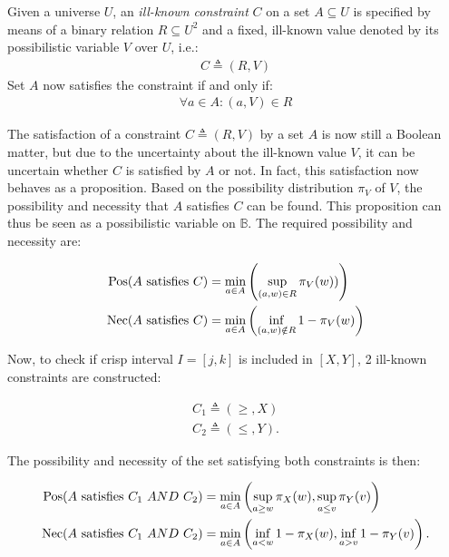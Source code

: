 \begin{definition}
Given a universe $U$, an \emph{ill-known constraint} $C$ on a set $A \subseteq U$ is specified by means of a binary relation $R \subseteq U^{2}$ and a fixed, ill-known value denoted by its possibilistic variable $V$ over $U$, i.e.:
\begin{align}
C \triangleq (R,V)
\end{align}
Set $A$ now satisfies the constraint if and only if:
\begin{align}
\forall a \in A : (a,V) \in R
\end{align}
\end{definition}

The satisfaction of a constraint $C \triangleq (R,V)$ by a set $A$ is now still a Boolean matter, but due to the uncertainty about the ill-known value $V$, it can be uncertain whether $C$ is satisfied by $A$ or not\cite{Pon11}. In fact, this satisfaction now behaves as a proposition. Based on the possibility distribution $\pi_{V}$ of $V$, the possibility and necessity that $A$ satisfies $C$ can be found. This proposition can thus be seen as a possibilistic variable on $\mathbb{B}$. The required possibility and necessity are:

\begin{align}
\operatorname{Pos}(A\text{ satisfies }C) & = \min_{a \in A}\left(\sup_{(a,w) \in R}\pi_{V}(w))\right) \\
\operatorname{Nec}(A\text{ satisfies }C) & = \min_{a \in A}\left(\inf_{(a,w) \notin R} 1-\pi_{V}(w)\right)
\end{align}

Now, to check if crisp interval $I = \left[j, k\right]$ is included in $\left[X, Y\right]$, 2 ill-known constraints are constructed:


\begin{eqnarray}
C_1\triangleq\left(\geq,X\right)\\
C_2\triangleq\left(\leq,Y\right).
\end{eqnarray}

The possibility and necessity of the set satisfying both constraints is then:

\begin{align}
\label{eq:interval-pos}
\operatorname{Pos}(A\text{ satisfies }C_1\ AND\ C_2) & = \min_{a \in A}\left(\sup_{a \geq w}\pi_{X}(w),\sup_{a \leq v}\pi_{Y}(v)\right)\\
\label{eq:interval-nec}
\operatorname{Nec}(A\text{ satisfies }C_1\ AND\ C_2) & = \min_{a \in A}\left(\inf_{a < w} 1-\pi_{X}(w),\inf_{a > v} 1-\pi_{Y}(v)\right).
\end{align}

